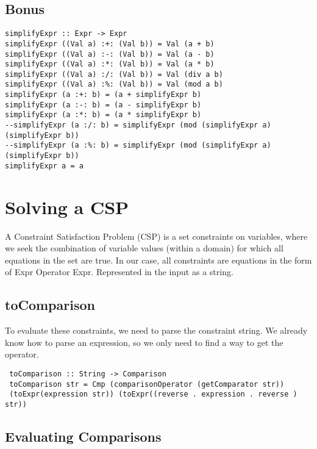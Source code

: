 \documentclass[a4paper,11pt]{article}
\begin{document}
\subsection{Bonus}
\begin{lstlisting}
simplifyExpr :: Expr -> Expr
simplifyExpr ((Val a) :+: (Val b)) = Val (a + b)
simplifyExpr ((Val a) :-: (Val b)) = Val (a - b)
simplifyExpr ((Val a) :*: (Val b)) = Val (a * b)
simplifyExpr ((Val a) :/: (Val b)) = Val (div a b)
simplifyExpr ((Val a) :%: (Val b)) = Val (mod a b)
simplifyExpr (a :+: b) = (a + simplifyExpr b)
simplifyExpr (a :-: b) = (a - simplifyExpr b)
simplifyExpr (a :*: b) = (a * simplifyExpr b)
--simplifyExpr (a :/: b) = simplifyExpr (mod (simplifyExpr a) (simplifyExpr b))
--simplifyExpr (a :%: b) = simplifyExpr (mod (simplifyExpr a) (simplifyExpr b))
simplifyExpr a = a

\end{lstlisting}

\section{Solving a CSP}
 
 A Constraint Satisfaction Problem (CSP) is a set constraints on variables,  
 where we seek the combination of variable values (within a domain) for 
 which all equations in the set are true. In our case, all constraints are 
 equations in the form of Expr Operator Expr. Represented in the input as a 
 string. 
 
 \subsection{toComparison}
 
 To evaluate these constraints, we need to parse the constraint string. We 
 already know how to parse an expression, so we only need to find a way to 
 get the operator.
 \begin{lstlisting}
 toComparison :: String -> Comparison
 toComparison str = Cmp (comparisonOperator (getComparator str)) 
 (toExpr(expression str)) (toExpr((reverse . expression . reverse ) str))
 \end{lstlisting}
 
 \subsection{Evaluating Comparisons}
 
\end{document}
